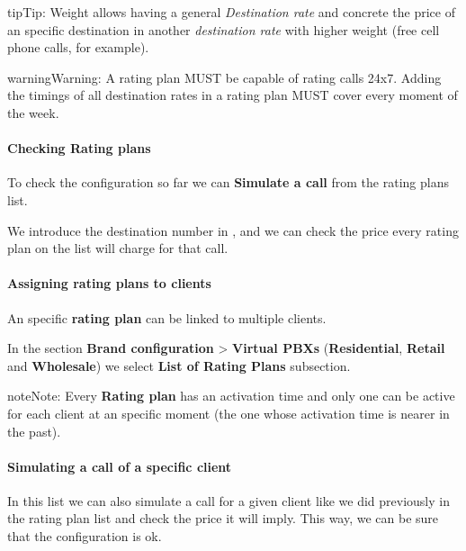 \documentclass[letterpaper,10pt,english]{sphinxmanual}
\begin{document}
\begin{notice}{tip}{Tip:}
Weight allows having a general \emph{Destination rate} and concrete the price of
an specific destination in another \emph{destination rate} with higher weight (free cell
phone calls, for example).
\end{notice}

\begin{notice}{warning}{Warning:}
A rating plan MUST be capable of rating calls 24x7. Adding the timings of all destination rates in a rating
plan MUST cover every moment of the week.
\end{notice}
\paragraph{Checking Rating plans}

To check the configuration so far we can \textbf{Simulate a call} from the rating plans list.

We introduce the destination number in {\hyperref[administration_portal/brand/settings/numeric_transformations:e164]{}}, and we can check the price every rating plan on the
list will charge for that call.


\paragraph{Assigning rating plans to clients}
\label{administration_portal/brand/billing/rating_plans:assigning-rating-plans-to-clients}
An specific \textbf{rating plan} can be linked to multiple clients.

In the section \textbf{Brand configuration} \textgreater{} \textbf{Virtual PBXs} (\textbf{Residential}, \textbf{Retail} and \textbf{Wholesale}) we select
\textbf{List of Rating Plans} subsection.

\begin{notice}{note}{Note:}
Every \textbf{Rating plan} has an activation time and only one can be active for each
client at an specific moment (the one whose activation time is nearer in the past).
\end{notice}
\paragraph{Simulating a call of a specific client}

In this list we can also simulate a call for a given client like we did previously
in the rating plan list and check the price it will imply. This way, we can be sure
that the configuration is ok.
\end{document}
